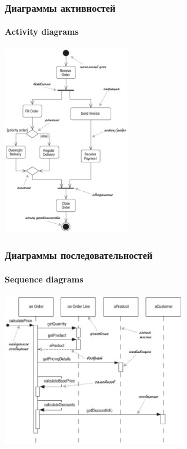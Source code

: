 \documentclass{../../slides-style}
\begin{document}
    \begin{frame}
        \frametitle{Диаграммы активностей}
        \framesubtitle{Activity diagrams}
        \begin{center}
            \includegraphics[width=0.415\textwidth]{activityDiagram.png}
        \end{center}
    \end{frame}

    \begin{frame}
        \frametitle{Диаграммы последовательностей}
        \framesubtitle{Sequence diagrams}
        \begin{center}
            \includegraphics[width=0.6\textwidth]{sequenceDiagram.png}
        \end{center}
    \end{frame}
\end{document}
